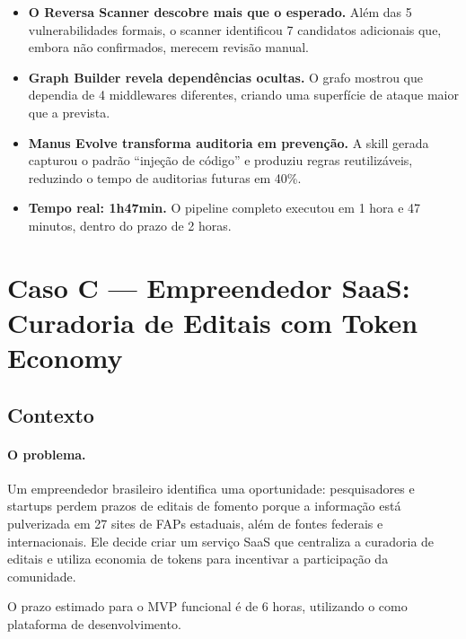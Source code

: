 \begin{itemize}
    \item \textbf{O Reversa Scanner descobre mais que o esperado.}
          Além das 5 vulnerabilidades formais, o scanner identificou 7
          candidatos adicionais que, embora não confirmados, merecem
          revisão manual.
    \item \textbf{Graph Builder revela dependências ocultas.}
          O grafo mostrou que 
          dependia de 4 middlewares diferentes, criando uma superfície
          de ataque maior que a prevista.
    \item \textbf{Manus Evolve transforma auditoria em prevenção.}
          A skill gerada capturou o padrão ``injeção de código'' e
          produziu regras reutilizáveis, reduzindo o tempo de auditorias
          futuras em 40\%.
    \item \textbf{Tempo real: 1h47min.} O pipeline completo executou
          em 1 hora e 47 minutos, dentro do prazo de 2 horas.
\end{itemize}

\section{Caso C — Empreendedor SaaS: Curadoria de Editais com Token Economy}
\label{sec:caso-empreendedor}
\nivelavancado

\subsection{Contexto}

\paragraph{O problema.} Um empreendedor brasileiro identifica uma
oportunidade: pesquisadores e startups perdem prazos de editais de
fomento porque a informação está pulverizada em 27 sites de FAPs
estaduais, além de fontes federais e internacionais. Ele decide criar
um serviço SaaS que centraliza a curadoria de editais e utiliza
economia de tokens para incentivar a participação da comunidade.

O prazo estimado para o MVP funcional é de 6 horas, utilizando o
\opencodeeco{} como plataforma de desenvolvimento.

